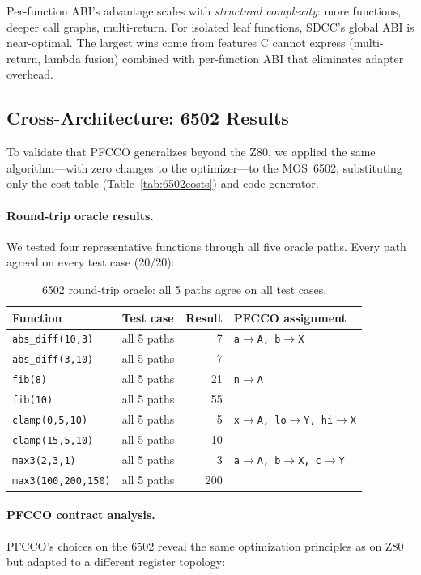 \documentclass[sigplan,screen,nonacm]{acmart}
\begin{document}
Per-function ABI's advantage scales with \emph{structural complexity}: more
functions, deeper call graphs, multi-return.  For isolated leaf functions,
SDCC's global ABI is near-optimal.  The largest wins come from features C
cannot express (multi-return, lambda fusion) combined with per-function ABI
that eliminates adapter overhead.

\subsection{Cross-Architecture: 6502 Results}
\label{sec:eval:6502}

To validate that PFCCO generalizes beyond the Z80, we applied the same
algorithm---with zero changes to the optimizer---to the MOS~6502, substituting
only the cost table (Table~\ref{tab:6502costs}) and code generator.

\paragraph{Round-trip oracle results.}
We tested four representative functions through all five oracle paths.
Every path agreed on every test case (20/20):

\begin{table}[h]
\centering\small
\caption{6502 round-trip oracle: all 5 paths agree on all test cases.}
\label{tab:6502oracle}
\begin{tabular}{@{}llrl@{}}
\toprule
Function & Test case & Result & PFCCO assignment \\
\midrule
\texttt{abs\_diff(10,3)} & all 5 paths & 7  & \texttt{a$\to$A, b$\to$X} \\
\texttt{abs\_diff(3,10)} & all 5 paths & 7  & \\
\texttt{fib(8)}          & all 5 paths & 21 & \texttt{n$\to$A} \\
\texttt{fib(10)}         & all 5 paths & 55 & \\
\texttt{clamp(0,5,10)}   & all 5 paths & 5  & \texttt{x$\to$A, lo$\to$Y, hi$\to$X} \\
\texttt{clamp(15,5,10)}  & all 5 paths & 10 & \\
\texttt{max3(2,3,1)}     & all 5 paths & 3  & \texttt{a$\to$A, b$\to$X, c$\to$Y} \\
\texttt{max3(100,200,150)} & all 5 paths & 200 & \\
\bottomrule
\end{tabular}
\end{table}

\paragraph{PFCCO contract analysis.}
PFCCO's choices on the 6502 reveal the same optimization principles as on Z80
but adapted to a different register topology:
\end{document}
